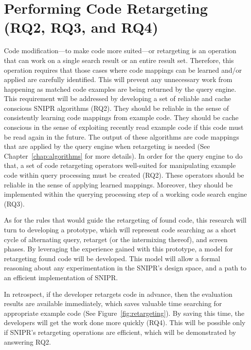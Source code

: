 \section{Performing Code Retargeting (RQ2, RQ3, and RQ4)}
\label{sec:restqs}
Code modification---to make code more suited---or retargeting is an operation that can work on a single search result or an entire result set. Therefore, this operation requires that those cases where code mappings can be learned and/or applied are carefully identified. This will prevent any unnecessary work from happening as matched code examples are being returned by the query engine. This requirement will be addressed by developing a set of reliable and cache conscious \uppercase{SnipR} algorithms (RQ2). They should be reliable in the sense of consistently learning code mappings from example code. They should be cache conscious in the sense of exploiting recently read example code if this code must be read again in the future. The output of these algorithms are code mappings that are applied by the query engine when retargeting is needed (See Chapter~\ref{chap:algorithms} for more details). In order for the query engine to do that, a set of code retargeting operators well-suited for manipulating example code within query processing must be created (RQ2). These operators should be reliable in the sense of applying learned mappings. Moreover, they should be implemented within the querying processing step of a working code search engine (RQ3). 

As for the rules that would guide the retargeting of found code, this research will turn to developing a prototype, which will represent code searching as a short cycle of alternating query, retarget (or the intermixing thereof), and screen phases. By leveraging the experience gained with this prototype, a model for retargeting found code will be developed. This model will allow a formal reasoning about any experimentation in the \uppercase{SnipR}'s design space, and a path to an efficient implementation of \uppercase{SnipR}. 

In retrospect, if the developer retargets code in advance, then the evaluation results are available immediately, which saves valuable time searching for appropriate example code (See Figure~\ref{fig:retargeting}). By saving this time, the developers will get the work done more quickly (RQ4). This will be possible only if \uppercase{SnipR}'s retargeting operations are efficient, which will be demonstrated by answering RQ2. 


